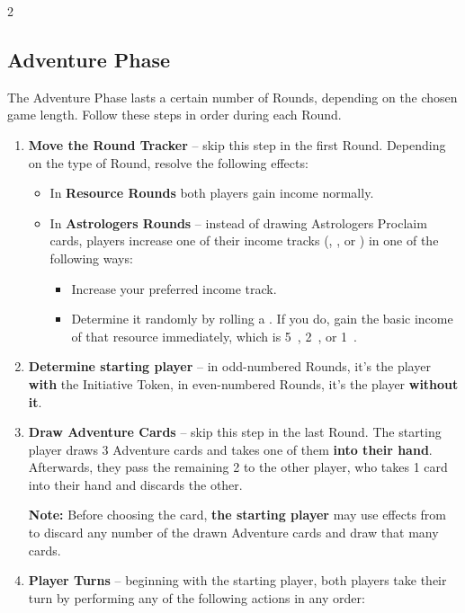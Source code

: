 \begin{expansion}
\begin{multicols}{2}
  \subsection*{Adventure Phase}
  The Adventure Phase lasts a certain number of Rounds, depending on the chosen game length.
  Follow these steps in order during each Round.\par
  \begin{enumerate}[leftmargin=1.3em]
    \item \textbf{Move the Round Tracker} -- skip this step in the first Round.
    Depending on the type of Round, resolve the following effects:
    \begin{itemize}
      \item In \textbf{Resource Rounds} both players gain income normally.
      \item In \textbf{Astrologers Rounds} -- instead of drawing Astrologers Proclaim cards, players increase one of their income tracks (, , or ) in one of the following ways:
      \begin{itemize}
        \item Increase your preferred income track.
        \item Determine it randomly by rolling a .
          If you do, gain the basic income of that resource immediately, which is 5~, 2~, or 1~.
      \end{itemize}
    \end{itemize}
    \item \textbf{Determine starting player} -- in odd-numbered Rounds, it's the player \textbf{with} the Initiative Token, in even-numbered Rounds, it's the player \textbf{without it}.
    \item \textbf{Draw Adventure Cards} -- skip this step in the last Round.
    The starting player draws 3 Adventure cards and takes one of them \textbf{into their hand}.
    Afterwards, they pass the remaining 2 to the other player, who takes 1 card into their hand and discards the other.\par
    \textbf{Note:} Before choosing the card, \textbf{the starting player} may use  effects from  to discard any number of the drawn Adventure cards and draw that many cards.\par
    \item \textbf{Player Turns} -- beginning with the starting player, both players take their turn by performing any of the following actions in any order:

\end{enumerate}
\end{multicols}
\end{expansion}
